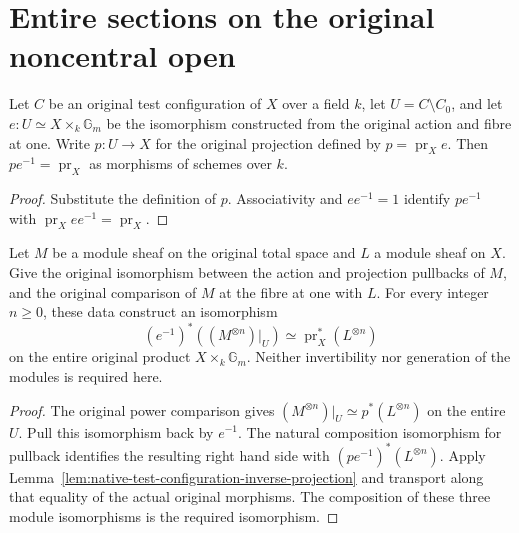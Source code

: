 \section{Entire sections on the original noncentral open}

\begin{lemma}\label{lem:native-test-configuration-inverse-projection}
\leanok
Let $C$ be an original test configuration of $X$ over a field $k$, let
$U=C\setminus C_0$, and let $e:U\simeq X\times_k\mathbb G_m$ be the
isomorphism constructed from the original action and fibre at one. Write
$p:U\to X$ for the original projection defined by $p=\operatorname{pr}_X e$.
Then $p e^{-1}=\operatorname{pr}_X$ as morphisms of schemes over $k$.
\end{lemma}
\begin{proof}
Substitute the definition of $p$. Associativity and $e e^{-1}=1$ identify
$p e^{-1}$ with $\operatorname{pr}_X e e^{-1}=\operatorname{pr}_X$.
\end{proof}

\begin{theorem}\label{thm:native-test-configuration-product-power-line}
\leanok
Let $M$ be a module sheaf on the original total space and $L$ a module
sheaf on $X$. Give the original isomorphism between the action and projection
pullbacks of $M$, and the original comparison of $M$ at the fibre at one
with $L$. For every integer $n\geq0$, these data construct an isomorphism
\[
(e^{-1})^*((M^{\otimes n})|_U)
  \simeq \operatorname{pr}_X^*(L^{\otimes n})
\]
on the entire original product $X\times_k\mathbb G_m$.
Neither invertibility nor generation of the modules is required here.
\end{theorem}
\begin{proof}
The original power comparison gives
$(M^{\otimes n})|_U\simeq p^*(L^{\otimes n})$ on the entire $U$.
Pull this isomorphism back by $e^{-1}$. The natural composition
isomorphism for pullback identifies the resulting right hand side with
$(p e^{-1})^*(L^{\otimes n})$. Apply
Lemma~\ref{lem:native-test-configuration-inverse-projection} and transport
along that equality of the actual original morphisms. The composition of
these three module isomorphisms is the required isomorphism.
\end{proof}

